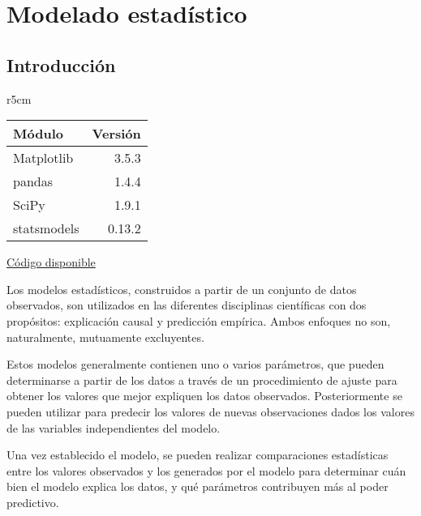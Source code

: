 

 \chapter{Modelado estadístico} \label{ch:modest}   

 \section{Introducción}

\begin{wraptable}{r}{5cm}
\begin{modulesinfo}
\begin{center}
{\small
    \begin{tabular}{l r}
        \toprule
        \textbf{Módulo} & \textbf{Versión} \\
        \midrule
        Matplotlib & 3.5.3 \\
        pandas & 1.4.4 \\
        SciPy & 1.9.1 \\
        statsmodels & 0.13.2 \\
        \bottomrule
    \end{tabular}
    \vspace{0.75em}
    
    \href{https://github.com/facundobatista/libro-pyciencia/tree/master/código/modelado_estadistico/}{Código disponible}
}
\end{center}
\end{modulesinfo}
\end{wraptable}

Los modelos estadísticos, construidos a partir de un conjunto de datos observados, son utilizados en las diferentes disciplinas científicas con dos propósitos: explicación causal y predicción empírica. Ambos enfoques no son, naturalmente, mutuamente excluyentes.

Estos modelos generalmente contienen uno o varios parámetros, que pueden determinarse a partir de los datos a través de un procedimiento de ajuste para obtener los valores que mejor expliquen los datos observados. Posteriormente se pueden utilizar para predecir los valores de nuevas observaciones dados los valores de las variables independientes del modelo.

Una vez establecido el modelo, se pueden realizar comparaciones estadísticas entre los valores observados y los generados por el modelo para determinar cuán bien el modelo explica los datos, y qué parámetros contribuyen más al poder predictivo.

